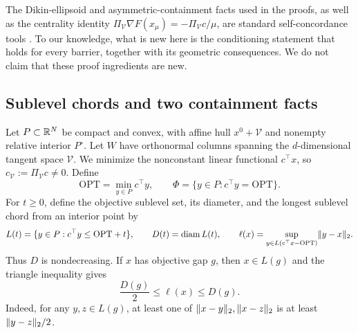 \begin{remark}
\label{rem:conditioning-novelty}
The Dikin-ellipsoid and asymmetric-containment facts used in the proofs, as
well as the centrality identity
$\Pi_{\mathcal V}\nabla F(x_\mu)=-\Pi_{\mathcal V}c/\mu$, are standard
self-concordance tools
\cite{nesterov1994-interior-point-polynomial-algorithms-convex,renegar2001-mathematical-view-ipm}.
To our knowledge, what is new here is the conditioning statement that holds
for every barrier, together with its geometric consequences.  We do not claim
that these proof ingredients are new.
\end{remark}

\subsection{Sublevel chords and two containment facts}
\label{sec:conditioning-setup}

Let $P\subset\mathbb{R}^N$ be compact and convex, with affine hull
$x^0+\mathcal V$ and nonempty relative interior $P^\circ$.  Let $W$ have
orthonormal columns spanning the $d$-dimensional tangent space $\mathcal V$.
We minimize the nonconstant linear functional $c^\top x$, so
$c_{\mathcal V}:=\Pi_{\mathcal V}c\ne0$.  Define
\begin{equation}
 \mathrm{OPT}=\min_{y\in P}c^\top y,
 \qquad
 \Phi=\{y\in P:c^\top y=\mathrm{OPT}\}.
 \label{eq:conditioning-optimal-face}
\end{equation}
For $t\geq0$, define the objective sublevel set, its diameter, and the longest
sublevel chord from an interior point by
\begin{equation}
 L(t)=\{y\in P:c^\top y\leq\mathrm{OPT}+t\},\qquad
 D(t)=\operatorname{diam} L(t),\qquad
 \ell(x)=\sup_{y\in L(c^\top x-\mathrm{OPT})}\lVert y-x\rVert_2.
 \label{eq:sublevel-chord-definitions}
\end{equation}
Thus $D$ is nondecreasing.  If $x$ has objective gap $g$, then $x\in L(g)$
and the triangle inequality gives
\begin{equation}
 \frac{D(g)}2\leq\ell(x)\leq D(g).
 \label{eq:diameter-chord-comparison}
\end{equation}
Indeed, for any $y,z\in L(g)$, at least one of
$\lVert x-y\rVert_2,\lVert x-z\rVert_2$ is at least $\lVert y-z\rVert_2/2$.

